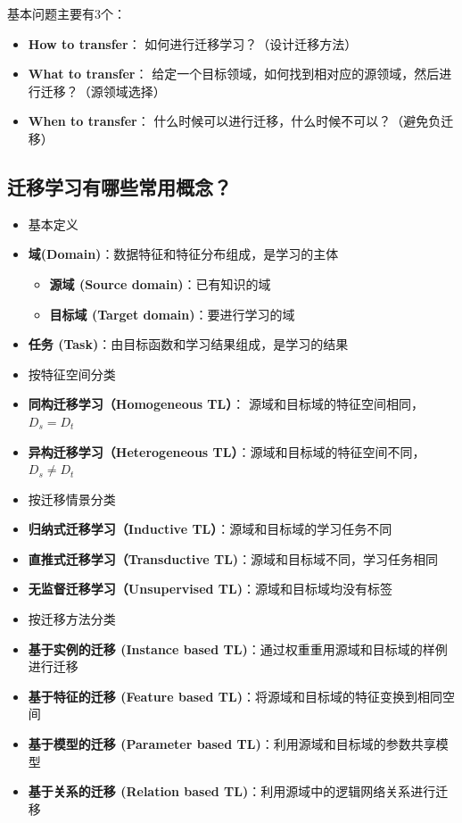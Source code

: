 基本问题主要有3个：

\begin{itemize}
\tightlist
\item
  \textbf{How to transfer}： 如何进行迁移学习？（设计迁移方法）
\item
  \textbf{What to transfer}：
  给定一个目标领域，如何找到相对应的源领域，然后进行迁移？（源领域选择）
\item
  \textbf{When to transfer}：
  什么时候可以进行迁移，什么时候不可以？（避免负迁移）
\end{itemize}

\subsection{迁移学习有哪些常用概念？}\label{ux8fc1ux79fbux5b66ux4e60ux6709ux54eaux4e9bux5e38ux7528ux6982ux5ff5}

\begin{itemize}
\tightlist
\item
  基本定义
\item
  \textbf{域(Domain)}：数据特征和特征分布组成，是学习的主体

  \begin{itemize}
  \tightlist
  \item
    \textbf{源域 (Source domain)}：已有知识的域
  \item
    \textbf{目标域 (Target domain)}：要进行学习的域
  \end{itemize}
\item
  \textbf{任务 (Task)}：由目标函数和学习结果组成，是学习的结果
\item
  按特征空间分类
\item
  \textbf{同构迁移学习（Homogeneous TL）}：
  源域和目标域的特征空间相同，\(D_s=D_t\)
\item
  \textbf{异构迁移学习（Heterogeneous
  TL）}：源域和目标域的特征空间不同，\(D_s\ne D_t\)
\item
  按迁移情景分类
\item
  \textbf{归纳式迁移学习（Inductive TL）}：源域和目标域的学习任务不同
\item
  \textbf{直推式迁移学习（Transductive
  TL)}：源域和目标域不同，学习任务相同
\item
  \textbf{无监督迁移学习（Unsupervised TL)}：源域和目标域均没有标签
\item
  按迁移方法分类
\item
  \textbf{基于实例的迁移 (Instance based
  TL)}：通过权重重用源域和目标域的样例进行迁移
\item
  \textbf{基于特征的迁移 (Feature based
  TL)}：将源域和目标域的特征变换到相同空间
\item
  \textbf{基于模型的迁移 (Parameter based
  TL)}：利用源域和目标域的参数共享模型
\item
  \textbf{基于关系的迁移 (Relation based
  TL)}：利用源域中的逻辑网络关系进行迁移
\end{itemize}

